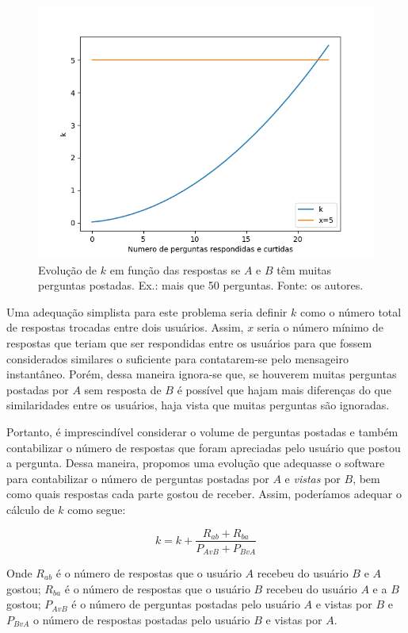 \begin{figure}[!htb]
\centering
\includegraphics[width=14cm]{muitasquestoes.png}
\caption{Evolução de $k$ em função das respostas se $A$ e $B$ têm muitas perguntas postadas. Ex.: mais que 50 perguntas. Fonte: os autores.}
\label{fig:muitasquestoes}
\end{figure}

Uma adequação simplista para este problema seria definir $k$ como o número total de respostas trocadas entre dois usuários. Assim, $x$ seria o número mínimo de respostas que teriam que ser respondidas entre os usuários para que fossem considerados similares o suficiente para contatarem-se pelo mensageiro instantâneo. Porém, dessa maneira ignora-se que, se houverem muitas perguntas postadas por $A$ sem resposta de $B$ é possível que hajam mais diferenças do que similaridades entre os usuários, haja vista que muitas perguntas são ignoradas.

Portanto, é imprescindível considerar o volume de perguntas postadas e também contabilizar o número de respostas que foram apreciadas pelo usuário que postou a pergunta. Dessa maneira, propomos uma evolução que adequasse o software para contabilizar o número de perguntas postadas por $A$ e \emph{vistas} por $B$, bem como quais respostas cada parte gostou de receber. Assim, poderíamos adequar o cálculo de $k$ como segue: 

\begin{equation}
k = k + \frac{R_{ab} + R_{ba}}{P_{AvB} + P_{BvA}} 
\label{eq:k2}
\end{equation}

Onde $R_{ab}$ é o número de respostas que o usuário $A$ recebeu do usuário $B$ e $A$ gostou; $R_{ba}$ é o número de respostas que o usuário $B$ recebeu do usuário $A$ e a $B$ gostou; $P_{AvB}$ é o número de perguntas postadas pelo usuário $A$ e vistas por $B$ e $P_{BvA}$ o número de respostas postadas pelo usuário $B$ e vistas por $A$.

